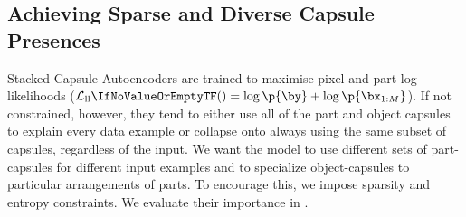 \subsection{Achieving Sparse and Diverse Capsule Presences}
\label{sec:losses}
Stacked Capsule Autoencoders are trained to maximise pixel and part log-likelihoods ($\loss[\mathrm{ll}]{} = \log\p{\by} + \log\p{\bx_{1:M}}$).
If not constrained, however, they tend to either use all of the part and object capsules to explain every data example or collapse onto always using the same subset of capsules, regardless of the input.
We want the model to use different sets of part-capsules for different input examples and to specialize object-capsules to particular arrangements of parts. 
To encourage this, we impose sparsity and entropy constraints.  We evaluate their importance in .

